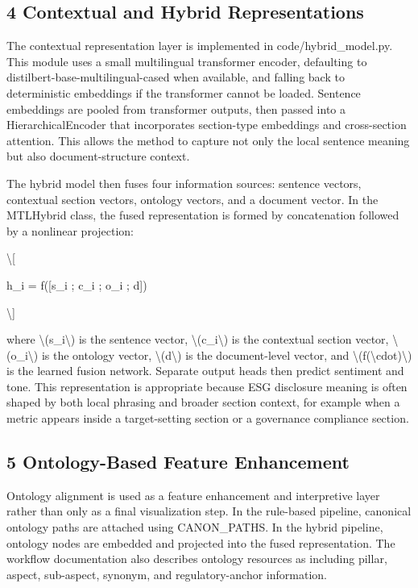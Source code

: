 \subsection{4 Contextual and Hybrid Representations}

The contextual representation layer is implemented in code/hybrid\_model.py. This module uses a small multilingual transformer encoder, defaulting to distilbert-base-multilingual-cased when available, and falling back to deterministic embeddings if the transformer cannot be loaded. Sentence embeddings are pooled from transformer outputs, then passed into a HierarchicalEncoder that incorporates section-type embeddings and cross-section attention. This allows the method to capture not only the local sentence meaning but also document-structure context.

The hybrid model then fuses four information sources: sentence vectors, contextual section vectors, ontology vectors, and a document vector. In the MTLHybrid class, the fused representation is formed by concatenation followed by a nonlinear projection:

\textbackslash{}[

h\_i = f([s\_i ; c\_i ; o\_i ; d])

\textbackslash{}]

where \textbackslash{}(s\_i\textbackslash{}) is the sentence vector, \textbackslash{}(c\_i\textbackslash{}) is the contextual section vector, \textbackslash{}(o\_i\textbackslash{}) is the ontology vector, \textbackslash{}(d\textbackslash{}) is the document-level vector, and \textbackslash{}(f(\textbackslash{}cdot)\textbackslash{}) is the learned fusion network. Separate output heads then predict sentiment and tone. This representation is appropriate because ESG disclosure meaning is often shaped by both local phrasing and broader section context, for example when a metric appears inside a target-setting section or a governance compliance section.

\subsection{5 Ontology-Based Feature Enhancement}

Ontology alignment is used as a feature enhancement and interpretive layer rather than only as a final visualization step. In the rule-based pipeline, canonical ontology paths are attached using CANON\_PATHS. In the hybrid pipeline, ontology nodes are embedded and projected into the fused representation. The workflow documentation also describes ontology resources as including pillar, aspect, sub-aspect, synonym, and regulatory-anchor information.

